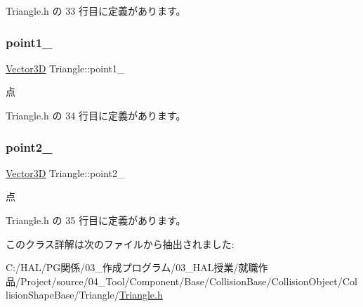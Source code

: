  Triangle.\+h の 33 行目に定義があります。

\mbox{\label{class_triangle_aa846eb6b25478f0227225c74c53bb5c1}} 
\subsubsection{\texorpdfstring{point1\+\_\+}{point1\_}}
{\footnotesize\ttfamily \mbox{\hyperlink{class_vector3_d}{Vector3D}} Triangle\+::point1\+\_\+\hspace{0.3cm}{\ttfamily [private]}}



点 



 Triangle.\+h の 34 行目に定義があります。

\mbox{\label{class_triangle_af1850003b6274357b9b081395e1ab4e8}} 
\subsubsection{\texorpdfstring{point2\+\_\+}{point2\_}}
{\footnotesize\ttfamily \mbox{\hyperlink{class_vector3_d}{Vector3D}} Triangle\+::point2\+\_\+\hspace{0.3cm}{\ttfamily [private]}}



点 



 Triangle.\+h の 35 行目に定義があります。



このクラス詳解は次のファイルから抽出されました\+:\begin{DoxyCompactItemize}
\item 
C\+:/\+H\+A\+L/\+P\+G関係/03\+\_\+作成プログラム/03\+\_\+\+H\+A\+L授業/就職作品/\+Project/source/04\+\_\+\+Tool/\+Component/\+Base/\+Collision\+Base/\+Collision\+Object/\+Collision\+Shape\+Base/\+Triangle/\mbox{\hyperlink{_triangle_8h}{Triangle.\+h}}\end{DoxyCompactItemize}
